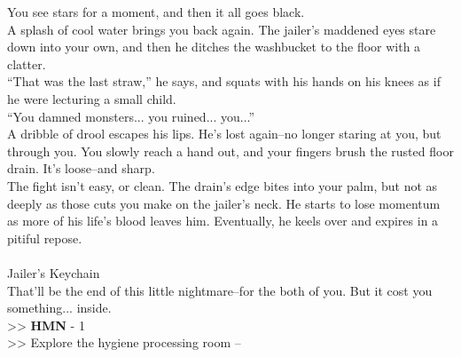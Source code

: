You see stars for a moment, and then it all goes black.\\

A splash of cool water brings you back again. The jailer’s maddened eyes stare down into your own, and then he ditches the washbucket to the floor with a clatter.\\
“That was the last straw,” he says, and squats with his hands on his knees as if he were lecturing a small child.\\

“You damned monsters... you ruined... you...”\\

A dribble of drool escapes his lips. He’s lost again--no longer staring at you, but through you. You slowly reach a hand out, and your fingers brush the rusted floor drain. It’s loose--and sharp.\\

The fight isn’t easy, or clean. The drain’s edge bites into your palm, but not as deeply as those cuts you make on the jailer's neck. He starts to lose momentum as more of his life’s blood leaves him. Eventually, he keels over and expires in a pitiful repose.\\
\\
 Jailer’s Keychain\\

That’ll be the end of this little nightmare--for the both of you. But it cost you something... inside.\\

>> \textbf{HMN} - 1\\
>> Explore the hygiene processing room -- 